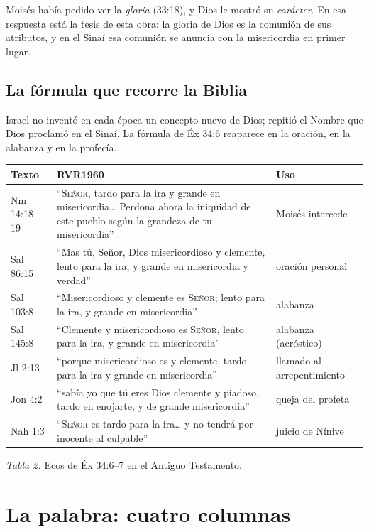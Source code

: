 \documentclass[11pt,letterpaper]{article}
\newcommand{\SENOR}{\textsc{Señor}}
\begin{document}
Moisés había pedido ver la \emph{gloria} (33:18), y Dios le mostró su \emph{carácter}. En esa respuesta está la tesis de esta obra: la gloria de Dios es la comunión de sus atributos, y en el Sinaí esa comunión se anuncia con la misericordia en primer lugar.

\subsection{La fórmula que recorre la Biblia}
Israel no inventó en cada época un concepto nuevo de Dios; repitió el Nombre que Dios proclamó en el Sinaí. La fórmula de Éx 34:6 reaparece en la oración, en la alabanza y en la profecía.

\begin{center}\small\renewcommand{\arraystretch}{1.2}
\begin{tabular}{@{}L{2.3cm}L{8.8cm}L{3.6cm}@{}}
\toprule
\textbf{Texto} & \textbf{RVR1960} & \textbf{Uso} \\ \midrule
Nm 14:18--19 & ``\SENOR, tardo para la ira y grande en misericordia\ldots{} Perdona ahora la iniquidad de este pueblo según la grandeza de tu misericordia'' & Moisés intercede \\
Sal 86:15 & ``Mas tú, Señor, Dios misericordioso y clemente, lento para la ira, y grande en misericordia y verdad'' & oración personal \\
Sal 103:8 & ``Misericordioso y clemente es \SENOR; lento para la ira, y grande en misericordia'' & alabanza \\
Sal 145:8 & ``Clemente y misericordioso es \SENOR, lento para la ira, y grande en misericordia'' & alabanza (acróstico) \\
Jl 2:13 & ``porque misericordioso es y clemente, tardo para la ira y grande en misericordia'' & llamado al arrepentimiento \\
Jon 4:2 & ``sabía yo que tú eres Dios clemente y piadoso, tardo en enojarte, y de grande misericordia'' & queja del profeta \\
Nah 1:3 & ``\SENOR{} es tardo para la ira\ldots{} y no tendrá por inocente al culpable'' & juicio de Nínive \\
\bottomrule
\end{tabular}\par
{\footnotesize\color{gris}\textit{Tabla 2.} Ecos de Éx 34:6--7 en el Antiguo Testamento.}
\end{center}

\section{La palabra: cuatro columnas}
\end{document}
